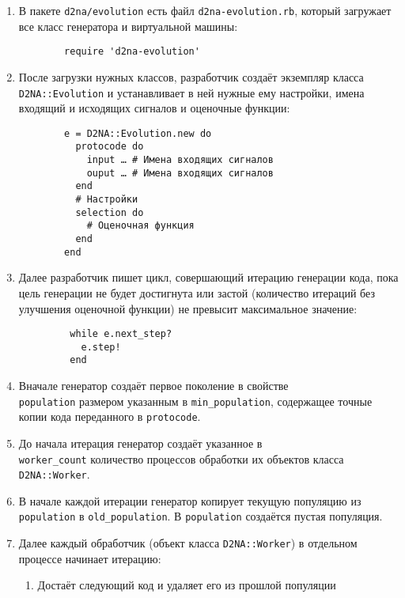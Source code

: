 \documentclass[utf8,a5paper,portrait,10pt]{eskdtext}
\begin{document}
\begin{enumerate}
  \item В пакете \texttt{d2na/evolution} есть файл \texttt{d2na-evolution.rb},
        который загружает все класс генератора и виртуальной машины:
        \begin{verbatim}
        require 'd2na-evolution'
        \end{verbatim}
  \item После загрузки нужных классов, разработчик создаёт экземпляр класса
        \texttt{D2NA::Evolution} и устанавливает в ней нужные ему настройки,
        имена входящий и исходящих сигналов и оценочные функции:
        \begin{verbatim}
        e = D2NA::Evolution.new do
          protocode do
            input … # Имена входящих сигналов
            ouput … # Имена входящих сигналов
          end
          # Настройки
          selection do
            # Оценочная функция
          end
        end
        \end{verbatim}
   \newpage
   \item Далее разработчик пишет цикл, совершающий итерацию генерации кода,
         пока цель генерации не будет достигнута или застой (количество
         итераций без улучшения оценочной функции) не превысит максимальное
         значение:
         \begin{verbatim}
         while e.next_step?
           e.step!
         end
         \end{verbatim}
  \item Вначале генератор создаёт первое поколение в свойстве\\
        \texttt{population} размером указанным в \texttt{min\_population},
        содержащее точные копии кода переданного в \texttt{protocode}.
  \item До начала итерация генератор создаёт указанное в\\
        \texttt{worker\_count} количество процессов обработки их объектов класса
        \texttt{D2NA::Worker}.
  \item В начале каждой итерации генератор копирует текущую популяцию из
        \texttt{population} в \texttt{old\_population}. В \texttt{population}
        создаётся пустая популяция.
  \item Далее каждый обработчик (объект класса \texttt{D2NA::Worker}) в
        отдельном процессе начинает итерацию:
        \begin{enumerate}
          \item Достаёт следующий код и удаляет его из прошлой популяции\\

\end{enumerate}
\end{enumerate}
\end{document}
